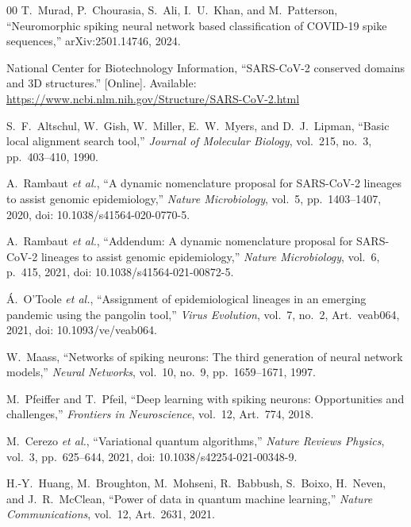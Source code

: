 \documentclass[10pt,a4paper]{article}
\begin{document}
\begin{table}[!ht]
\begin{minipage}{\textwidth}
    \end{minipage}
\end{table}

\FloatBarrier
\begingroup\footnotesize\setlength{\itemsep}{0pt}\setlength{\parsep}{0pt}\begin{thebibliography}{00}
T.~Murad, P.~Chourasia, S.~Ali, I.~U.~Khan, and M.~Patterson,
``Neuromorphic spiking neural network based classification of COVID-19 spike sequences,''
arXiv:2501.14746, 2024.

National Center for Biotechnology Information,
``SARS-CoV-2 conserved domains and 3D structures.''
[Online]. Available: \url{https://www.ncbi.nlm.nih.gov/Structure/SARS-CoV-2.html}

S.~F.~Altschul, W.~Gish, W.~Miller, E.~W.~Myers, and D.~J.~Lipman,
``Basic local alignment search tool,''
\textit{Journal of Molecular Biology}, vol.~215, no.~3, pp.~403--410, 1990.

A.~Rambaut \textit{et al.},
``A dynamic nomenclature proposal for SARS-CoV-2 lineages to assist genomic epidemiology,''
\textit{Nature Microbiology}, vol.~5, pp.~1403--1407, 2020,
doi: 10.1038/s41564-020-0770-5.

A.~Rambaut \textit{et al.},
``Addendum: A dynamic nomenclature proposal for SARS-CoV-2 lineages to assist genomic epidemiology,''
\textit{Nature Microbiology}, vol.~6, p.~415, 2021,
doi: 10.1038/s41564-021-00872-5.

\'{A}.~O'Toole \textit{et al.},
``Assignment of epidemiological lineages in an emerging pandemic using the pangolin tool,''
\textit{Virus Evolution}, vol.~7, no.~2, Art.~veab064, 2021,
doi: 10.1093/ve/veab064.

W.~Maass,
``Networks of spiking neurons: The third generation of neural network models,''
\textit{Neural Networks}, vol.~10, no.~9, pp.~1659--1671, 1997.

M.~Pfeiffer and T.~Pfeil,
``Deep learning with spiking neurons: Opportunities and challenges,''
\textit{Frontiers in Neuroscience}, vol.~12, Art.~774, 2018.

M.~Cerezo \textit{et al.},
``Variational quantum algorithms,''
\textit{Nature Reviews Physics}, vol.~3, pp.~625--644, 2021,
doi: 10.1038/s42254-021-00348-9.

H.-Y.~Huang, M.~Broughton, M.~Mohseni, R.~Babbush, S.~Boixo, H.~Neven, and J.~R.~McClean,
``Power of data in quantum machine learning,''
\textit{Nature Communications}, vol.~12, Art.~2631, 2021.


\end{thebibliography}
\end{document}
